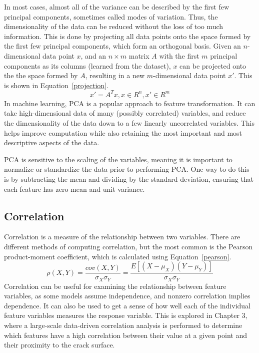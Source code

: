 In most cases, almost all of the variance can be described by the first few principal components, sometimes called modes of variation.  Thus, the dimensionality of the data can be reduced without the loss of too much information.  This is done by projecting all data points onto the space formed by the first few principal components, which form an orthogonal basis.  Given an $n$-dimensional data point $x$, and an $n \times m$ matrix $A$ with the first $m$ principal components as its columns (learned from the dataset), $x$ can be projected onto the the space formed by $A$, resulting in a new $m$-dimensional data point $x'$.  This is shown in Equation~\ref{projection}.
%
\begin{equation} 
x' = A^T x, x \in R^n, x' \in R^m
\label{projection}
\end{equation}
%
In machine learning, PCA is a popular approach to feature transformation.  It can take high-dimensional data of many (possibly correlated) variables, and reduce the dimensionality of the data down to a few linearly uncorrelated variables.  This helps 
improve computation while also retaining the most important and most descriptive aspects of the data.

PCA is sensitive to the scaling of the variables, meaning it is important to normalize or standardize the data prior to performing PCA.  One way to do this is by subtracting the mean and dividing by the standard deviation, ensuring that each feature has zero mean and unit variance.

\subsection{Correlation}
Correlation is a measure of the relationship between two variables.  There are different methods of computing correlation, but the most common is the Pearson product-moment coefficient, which is calculated using Equation~\ref{pearson}.
%
\begin{equation}
\rho(X, Y) = \frac{cov(X, Y)}{\sigma_X \sigma_Y} = \frac{E[(X - \mu_X)(Y - \mu_Y)]}{\sigma_X \sigma_Y}
\label{pearson}
\end{equation}
%
Correlation can be useful for examining the relationship between feature variables, as some models assume independence, and nonzero correlation implies dependence.  It can also be used to get a sense of how well each of the individual feature variables measures the response variable.  This is explored in Chapter 3, where a large-scale data-driven correlation analysis is performed to determine which features have a high correlation between their value at a given point and their proximity to the crack surface.

